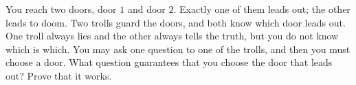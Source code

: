You reach two doors, door $1$ and door $2$. Exactly one of them leads out; the other leads to doom. Two trolls guard the doors, and both know which door leads out. One troll always lies and the other always tells the truth, but you do not know which is which. You may ask one question to one of the trolls, and then you must choose a door. What question guarantees that you choose the door that leads out? Prove that it works.

